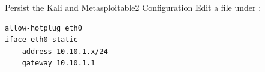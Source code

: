 \begin{frame}[fragile]{Persist the Kali and Metasploitable2 Configuration}
  Edit a file under :
  \begin{verbatim}
allow-hotplug eth0
iface eth0 static
    address 10.10.1.x/24
    gateway 10.10.1.1
  \end{verbatim}
\end{frame}
